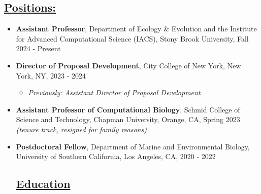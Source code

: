 \documentclass[]{res}
\begin{document}
 
 \small
{} %
 
 

\address{{\bf pronouns:} they/them/theirs {\emph{or}} she/her/hers\\ {\bf email:} jackie.weissman@stonybrook.edu}
\address{{\bf website:} https://microbialgamut.com/}%

 
\begin{resume} 
 

 \section{\underline{Positions:}} %
\begin{itemize}[leftmargin=*]
\setlength\itemsep{0.5em}
\item[] {\bf Assistant Professor}, Department of Ecology \& Evolution and the Institute for Advanced Computational Science (IACS), Stony Brook University, Fall 2024 - Present
\item[] {\bf Director of Proposal Development}, City College of New York, New York, NY, 2023 - 2024
\begin{itemize}[leftmargin=*]
\item \emph{Previously: Assistant Director of Proposal Development}
\end{itemize}
\item[] {\bf Assistant Professor of Computational Biology}, Schmid College of Science and Technology, Chapman University, Orange, CA, Spring 2023 \emph{(tenure track, resigned for family reasons)}
\item[] {\bf Postdoctoral Fellow}, Department of Marine and Environmental Biology, University of Southern California, Los Angeles, CA, 2020 - 2022

\section{\underline{Education}} %


\end{itemize}
\end{resume}
\end{document}
